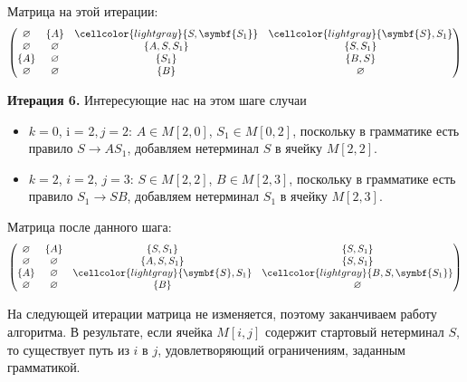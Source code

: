 \begin{example}
    Матрица на этой итерации:
    \[
        \begin{pmatrix}
            \varnothing & \{A\}       & \cellcolor{lightgray}\{S, \symbf{S_1}\} & \cellcolor{lightgray}\{\symbf{S}, S_1\} \\
            \varnothing & \varnothing & \{A, S, S_1\}                           & \{S, S_1\}                              \\
            \{A\}       & \varnothing & \{S_1\}                                 & \{B, S\}                                \\
            \varnothing & \varnothing & \{B\}                                   & \varnothing
        \end{pmatrix}
    \]

    \textbf{Итерация 6.}
    Интересующие нас на этом шаге случаи
    \begin{itemize}
        \item $k = 0$, i = 2$, j = 2$: $A \in M[2, 0]$, $S_1 \in M[0, 2]$, поскольку в грамматике есть правило $S \to A S_1$, добавляем нетерминал $S$ в ячейку $M[2, 2]$.
        \item $k = 2$, $i = 2$, $j = 3$: $S \in M[2, 2]$, $B \in M[2, 3]$, поскольку в грамматике есть правило $S_1 \to S B$, добавляем нетерминал $S_1$ в ячейку $M[2, 3]$.
    \end{itemize}

    Матрица после данного шага:
    \[
        \begin{pmatrix}
            \varnothing & \{A\}       & \{S, S_1\}                              & \{S, S_1\}                                 \\
            \varnothing & \varnothing & \{A, S, S_1\}                           & \{S, S_1\}                                 \\
            \{A\}       & \varnothing & \cellcolor{lightgray}\{\symbf{S}, S_1\} & \cellcolor{lightgray}\{B, S, \symbf{S_1}\} \\
            \varnothing & \varnothing & \{B\}                                   & \varnothing
        \end{pmatrix}
    \]

    На следующей итерации матрица не изменяется, поэтому заканчиваем работу алгоритма.
    В результате, если ячейка $M[i, j]$ содержит стартовый нетерминал $S$, то существует путь из $i$ в $j$, удовлетворяющий ограничениям, заданным грамматикой.
\end{example}

